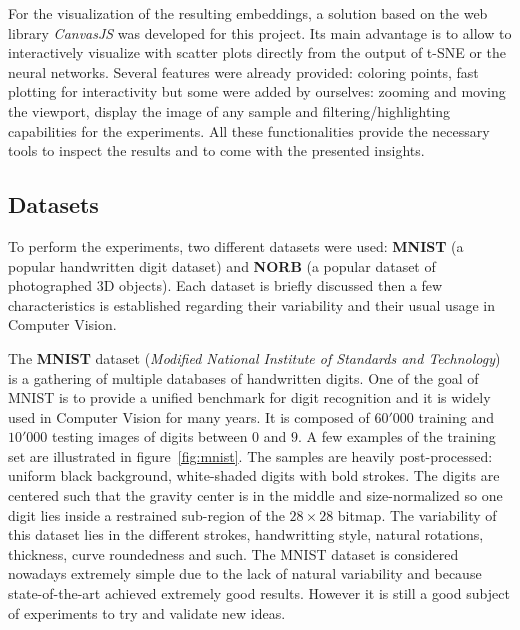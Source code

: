 \documentclass[a4paper,12pt]{report}
\begin{document}
For the visualization of the resulting embeddings, a solution based on the web library {\em CanvasJS} was developed for this project.
Its main advantage is to allow to interactively visualize with scatter plots directly from the output of t-SNE or the neural networks.
Several features were already provided: coloring points, fast plotting for interactivity but some were added by ourselves: zooming and moving the viewport, display the image of any sample and filtering/highlighting capabilities for the experiments.
All these functionalities provide the necessary tools to inspect the results and to come with the presented insights.

\subsection{Datasets}
To perform the experiments, two different datasets were used: {\bf MNIST}\cite{lecun1998mnist} (a popular handwritten digit dataset) and {\bf NORB}\cite{lecun2004learning} (a popular dataset of photographed 3D objects).
Each dataset is briefly discussed then a few characteristics is established regarding their variability and their usual usage in Computer Vision.

The {\bf MNIST} dataset ({\em Modified National Institute of Standards and Technology}) is a gathering of multiple databases of handwritten digits.
One of the goal of MNIST is to provide a unified benchmark for digit recognition and it is widely used in Computer Vision for many years.
It is composed of $60'000$ training and $10'000$ testing images of digits between $0$ and $9$.
A few examples of the training set are illustrated in figure~\ref{fig:mnist}.
The samples are heavily post-processed: uniform black background, white-shaded digits with bold strokes.
The digits are centered such that the gravity center is in the middle and size-normalized so one digit lies inside a restrained sub-region of the $28 \times 28$ bitmap.
The variability of this dataset lies in the different strokes, handwritting style, natural rotations, thickness, curve roundedness and such.
The MNIST dataset is considered nowadays extremely simple due to the lack of natural variability and because state-of-the-art achieved extremely good results.
However it is still a good subject of experiments to try and validate new ideas.
\end{document}

